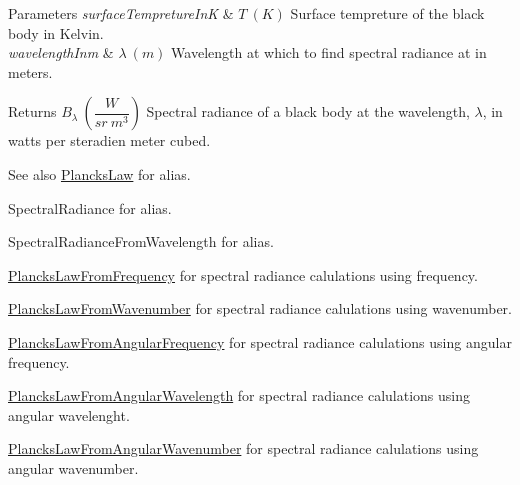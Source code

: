 \begin{DoxyParams}{Parameters}
{\em surface\+Tempreture\+InK} & $T\ (K)$ Surface tempreture of the black body in Kelvin. \\
\hline
{\em wavelength\+Inm} & $\lambda\ (m)$ Wavelength at which to find spectral radiance at in meters. \\
\hline
\end{DoxyParams}
\begin{DoxyReturn}{Returns}
$B_{\lambda}\ ( \dfrac{W}{sr\ m^3})$ Spectral radiance of a black body at the wavelength, $\lambda$, in watts per steradien meter cubed. 
\end{DoxyReturn}
\begin{DoxySeeAlso}{See also}
\mbox{\hyperlink{group___e_g_x_phys-_electrodynamics-_black_body-_plancks_law_ga44d8dc3e072ffc7d860cd8f07463f091}{Plancks\+Law}} for alias. 

Spectral\+Radiance for alias. 

Spectral\+Radiance\+From\+Wavelength for alias. 

\mbox{\hyperlink{group___e_g_x_phys-_electrodynamics-_black_body-_plancks_law_ga68aae82f8a086831358c4a61c8c80ba4}{Plancks\+Law\+From\+Frequency}} for spectral radiance calulations using frequency. 

\mbox{\hyperlink{group___e_g_x_phys-_electrodynamics-_black_body-_plancks_law_ga6648ae2a0fbff6735c1e1a04c7cac746}{Plancks\+Law\+From\+Wavenumber}} for spectral radiance calulations using wavenumber. 

\mbox{\hyperlink{group___e_g_x_phys-_electrodynamics-_black_body-_plancks_law_gaac540560c71e30c02b91d22e417b5863}{Plancks\+Law\+From\+Angular\+Frequency}} for spectral radiance calulations using angular frequency. 

\mbox{\hyperlink{group___e_g_x_phys-_electrodynamics-_black_body-_plancks_law_ga7322124727f968d28807e918c5eeb23f}{Plancks\+Law\+From\+Angular\+Wavelength}} for spectral radiance calulations using angular wavelenght. 

\mbox{\hyperlink{group___e_g_x_phys-_electrodynamics-_black_body-_plancks_law_gaa3d3e0fdb77d25bdd40523f9975de902}{Plancks\+Law\+From\+Angular\+Wavenumber}} for spectral radiance calulations using angular wavenumber. 
\end{DoxySeeAlso}
\mbox{\label{group___e_g_x_phys-_electrodynamics-_black_body-_plancks_law_ga6648ae2a0fbff6735c1e1a04c7cac746}} 
